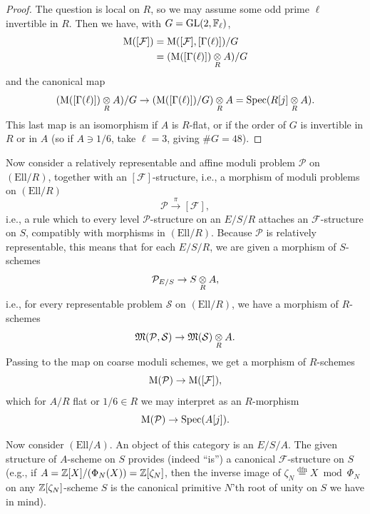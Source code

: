 \begin{proof}
The question is local on $R$, so we may assume some odd prime $\ell$ invertible in $R$. Then we have, with $G = \operatorname{GL}(2, \mathbb{F}_\ell)$,
\[
\begin{aligned}
\mathrm{M}([\mathcal{F}]) & = \mathrm{M}([\mathcal{F}], [\Gamma(\ell)])/G \\
& = (\mathrm{M}([\Gamma(\ell)]) \underset{R}{\otimes} A)/G
\end{aligned}
\]
and the canonical map
\[
(\mathrm{M}([\Gamma(\ell)]) \underset{R}{\otimes} A)/G \to (\mathrm{M}([\Gamma(\ell)])/G) \underset{R}{\otimes} A = \operatorname{Spec}(R[j] \underset{R}{\otimes} A) .
\]
This last map is an isomorphism if $A$ is $R$-flat, or if the order of $G$ is invertible in $R$ or in $A$ (so if $A \ni 1/6$, take $\ell = 3$, giving $\#G = 48$).
\end{proof}

\kmitem\label{item:9.1.4}
Now consider a relatively representable and affine moduli problem $\mathcal{P}$ on $(\mathrm{Ell}/R)$, together with an $[\mathcal{F}]$-structure, i.e., a morphism of moduli problems on $(\mathrm{Ell}/R)$
\begin{equation}\label{eq:9.1.4.1}
\mathcal{P} \xrightarrow{\ \pi\ } [\mathcal{F}] ,
\end{equation}
i.e., a rule which to every level $\mathcal{P}$-structure on an $E/S/R$ attaches an $\mathcal{F}$-structure on $S$, compatibly with morphisms in $(\mathrm{Ell}/R)$. Because $\mathcal{P}$ is relatively representable, this means that for each $E/S/R$, we are given a morphism of $S$-schemes
\begin{equation}\label{eq:9.1.4.2}
\mathcal{P}_{E/S} \to S \underset{R}{\otimes} A ,
\end{equation}
i.e., for every representable problem $\mathcal{S}$ on $(\mathrm{Ell}/R)$, we have a morphism of $R$-schemes
\begin{equation}\label{eq:9.1.4.3}
\mathfrak{M}(\mathcal{P}, \mathcal{S}) \to \mathfrak{M}(\mathcal{S}) \underset{R}{\otimes} A .
\end{equation}
Passing to the map on coarse moduli schemes, we get a morphism of $R$-schemes
\begin{equation}\label{eq:9.1.4.4}
\mathrm{M}(\mathcal{P}) \to \mathrm{M}([\mathcal{F}]) ,
\end{equation}
which for $A/R$ flat or $1/6 \in R$ we may interpret as an $R$-morphism
\begin{equation}\label{eq:9.1.4.5}
\mathrm{M}(\mathcal{P}) \to \operatorname{Spec}(A[j]) .
\end{equation}

\kmitem\label{item:9.1.5}
Now consider $(\mathrm{Ell}/A)$. An object of this category is an $E/S/A$. The given structure of $A$-scheme on $S$ provides (indeed ``is'') a canonical $\mathcal{F}$-structure on $S$ (e.g., if $A = \mathbb{Z}[X]/(\Phi_N(X)) = \mathbb{Z}[\zeta_N]$, then the inverse image of $\zeta_N \overset{\mathrm{dfn}}{=} X \bmod \Phi_N$ on any $\mathbb{Z}[\zeta_N]$-scheme $S$ is the canonical primitive $N$'th root of unity on $S$ we have in mind).

